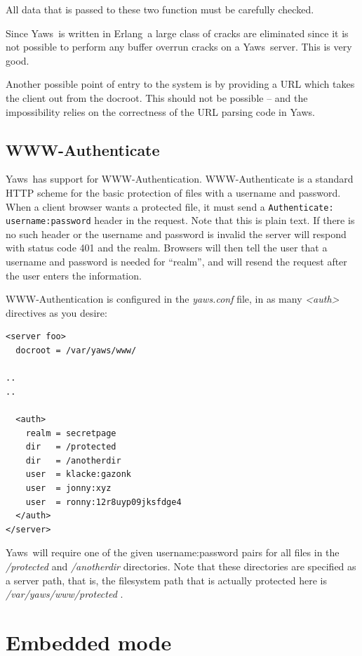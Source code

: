 \documentclass[11pt,oneside,english]{book}
\newcommand{\Erlang}            %
        {{\sc Erlang}}
\newcommand{\Yaws}            %
        {{\sc Yaws}}
\begin{document}
All data that is passed to these two function must be carefully
checked.

Since \Yaws\  is written in \Erlang\  a large class of cracks are
eliminated since it is not possible to perform any buffer overrun
cracks on a \Yaws\  server. This is very good.


Another possible point of entry to the system is by providing a URL
which takes the client out from the docroot. This should not be
possible -- and the impossibility relies on the correctness of the URL
parsing code in \Yaws{}.

\section{WWW-Authenticate}
\Yaws\  has support for WWW-Authentication.   WWW-Authenticate is a
standard HTTP scheme for the basic protection of files with a username
and password.  When a client browser wants a protected file, it must send a
\verb+Authenticate: username:password+ header in the request.  Note that
this is plain text.   If there is no such header or the username and
password is invalid the server will respond with status code 401 and
the realm.  Browsers will then tell the user that a username and
password is needed for ``realm'',  and will resend the request after
the user enters the information.

WWW-Authentication is configured in the \textit{yaws.conf} file, in as
many \textit{<auth>} directives as you desire:

\begin{verbatim}
<server foo>
  docroot = /var/yaws/www/

..
..

  <auth>
    realm = secretpage
    dir   = /protected
    dir   = /anotherdir
    user  = klacke:gazonk
    user  = jonny:xyz
    user  = ronny:12r8uyp09jksfdge4
  </auth>
</server>
\end{verbatim}


\Yaws\  will require one of the given username:password pairs for all
files in the \textit{/protected} and \textit{/anotherdir} directories.
Note that these directories are specified as a server path,  that is,
the filesystem path that is actually protected here is
\textit{/var/yaws/www/protected} .


\chapter {Embedded mode}
\label{embedded}
\end{document}

